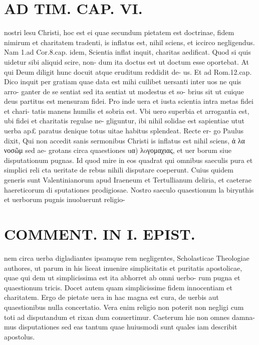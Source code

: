 \documentclass{article}
\begin{document}
\begin{pages}
\section*{AD TIM. CAP. VI. }
\marginpar{[ p.165 ]}\pstart nostri lesu Christi, hoc est ei quae secundum pietatem est doctrinae, fidem nimirum et charitatem tradenti, is inflatus est, nihil sciens, et iccirco negligendus. Nam 1.ad Cor.8.cap. idem, Scientia inflat inquit, charitas aedificat. Quod si quis uidetur sibi aliquid scire, non- dum ita doctus est ut doctum esse oportebat. At qui Deum diligit hunc docuit atque eruditum reddidit de- us. Et ad Rom.12.cap. Dico inquit per gratiam quae data est mihi cuilibet uersanti inter uos ne quis arro- ganter de se sentiat sed ita sentiat ut modestus et so- brius sit ut cuique deus partitus est mensuram fidei. Pro inde uera et iusta scientia intra metas fidei et chari- tatis manens humilis et sobria est. Vbi uero superbia et arrogantia est, ubi fidei et charitatis regulae ne- gliguntur, ibi nihil solidae est sapientiae utut uerba ap£ paratus denique totus uitae habitus splendeat. Recte er- go Paulus dixit, Qui non accedit sanis sermonibus Christi is inflatus est nihil sciens, ἀ λα νοσῶμ sed ae- grotans circa quaestiones uα) λoγομαχιας, et uer borum siue disputationum pugnas. Id quod mire in eos quadrat qui omnibus saeculis pura et simplici reli cta ueritate de rebus nihili disputare coeperunt. Cuius quidem generis sunt Valentinianorum apud Iraeneum et Tertullianum deliria, et caeterae haereticorum di sputationes prodigiosae. Nostro saeculo quaestionum la birynthis et uerborum pugnis inuoluerunt religio-  \pend
\section*{COMMENT. IN I. EPIST. }\pstart nem circa uerba digladiantes ipsamque rem negligentes, Scholasticae Theologiae authores, ut parum in his liceat inuenire simplicitatis et puritatis apostolicae, quae qui dem ut simplicissima est ita abhorret ab omni uerbo- rum pugna et quaestionum tricis. Docet autem quam simplicissime fidem innocentiam et charitatem. Ergo de pietate uera in hac magna est cura, de uerbis aut quaestionibus nulla concertatio. Vera enim religio non poterit non negligi cum toti ad disputandum et rixan dum conuertimur. Caeterum hie non omnes damna- mus disputationes sed eas tantum quae huiusmodi sunt quales iam describit apostolus.  \pend
{}
{}

\end{pages}
\end{document}
